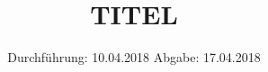 

\subject{501/2}
\title{TITEL}
\date{%
  Durchführung: 10.04.2018
  \hspace{3em}
  Abgabe: 17.04.2018
}



\maketitle
\thispagestyle{empty}
\tableofcontents
\newpage






\printbibliography{}


